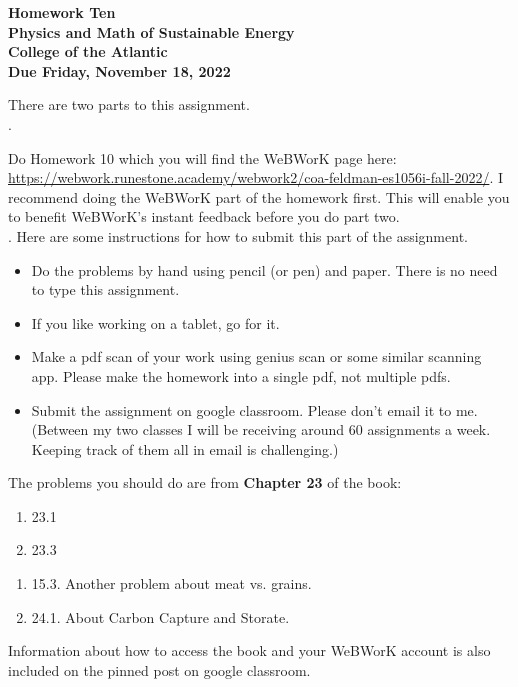 \documentclass[12pt]{article}
\begin{document}
\pagestyle{empty}
 
\begin{center}
{\LARGE {\bf Homework Ten}}\\
\bigskip
{\Large {\bf Physics and Math of Sustainable Energy}}\\
\bigskip
{\Large {\bf College of the Atlantic}}\\
\bigskip
{ {\bf Due Friday, November 18, 2022}}\\ 
\end{center}
\medskip


\noindent There are two parts to this assignment.\\

.

Do Homework 10 which you will find the WeBWorK page here:
\url{https://webwork.runestone.academy/webwork2/coa-feldman-es1056i-fall-2022/}.
I recommend doing the WeBWorK part of the homework first.  This will
enable you to benefit WeBWorK's instant feedback before you do part
two.\\ 


.  Here are some
instructions for how to submit this part of the assignment.
\begin{itemize}
\item Do the problems by hand using pencil (or pen) and paper.
  There is no need to type this assignment.
\item If you like working on a tablet, go for it. 
\item Make a pdf scan of your work using genius scan or some
  similar scanning app.  Please make the homework into a single
  pdf, not multiple pdfs.
\item Submit the assignment on google classroom.  Please don't
  email it to me.  (Between my two classes I will be receiving
  around 60 assignments a week.  Keeping track of them all in email 
  is challenging.)\\
\end{itemize}

\noindent The problems you should do are from {\bf Chapter 23} of the
book:  \\ 


\begin{enumerate}
  \setlength{\itemsep}{-1mm}
\item 23.1
\item 23.3 
\end{enumerate}


\begin{enumerate}
\setlength{\itemsep}{-1mm}
\item 15.3.  Another problem about meat vs. grains.
\item 24.1.  About Carbon Capture and Storate.
\end{enumerate}



\noindent Information about how to access the book and your WeBWorK
account is also included on the pinned post on google classroom. 
\end{document}
